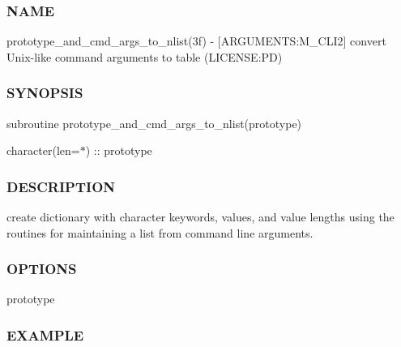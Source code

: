 \subsubsection*{N\+A\+ME}

prototype\+\_\+and\+\_\+cmd\+\_\+args\+\_\+to\+\_\+nlist(3f) -\/ \mbox{[}A\+R\+G\+U\+M\+E\+N\+TS\+:M\+\_\+\+C\+L\+I2\mbox{]} convert Unix-\/like command arguments to table (L\+I\+C\+E\+N\+SE\+:PD) \subsubsection*{S\+Y\+N\+O\+P\+S\+IS}

subroutine prototype\+\_\+and\+\_\+cmd\+\_\+args\+\_\+to\+\_\+nlist(prototype)

character(len=$\ast$) \+:\+: prototype \subsubsection*{D\+E\+S\+C\+R\+I\+P\+T\+I\+ON}

create dictionary with character keywords, values, and value lengths using the routines for maintaining a list from command line arguments. \subsubsection*{O\+P\+T\+I\+O\+NS}

prototype \subsubsection*{E\+X\+A\+M\+P\+LE}

